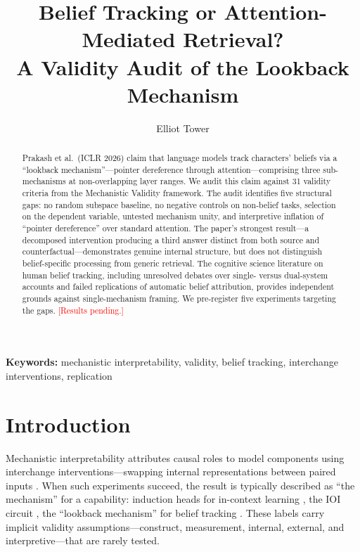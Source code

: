 \documentclass[11pt]{article}
\title{Belief Tracking or Attention-Mediated Retrieval?\\A Validity Audit of the Lookback Mechanism}
\author{Elliot Tower}
\affil{Independent Researcher \\ \texttt{elliot@elliottower.ai}}
\begin{document}
\linenumbers
\maketitle

\begin{abstract}
Prakash et al.\ (ICLR 2026) claim that language models track characters' beliefs via a ``lookback mechanism''---pointer dereference through attention---comprising three sub-mechanisms at non-overlapping layer ranges. We audit this claim against 31 validity criteria from the Mechanistic Validity framework. The audit identifies five structural gaps: no random subspace baseline, no negative controls on non-belief tasks, selection on the dependent variable, untested mechanism unity, and interpretive inflation of ``pointer dereference'' over standard attention. The paper's strongest result---a decomposed intervention producing a third answer distinct from both source and counterfactual---demonstrates genuine internal structure, but does not distinguish belief-specific processing from generic retrieval. The cognitive science literature on human belief tracking, including unresolved debates over single- versus dual-system accounts and failed replications of automatic belief attribution, provides independent grounds against single-mechanism framing. We pre-register five experiments targeting the gaps. \textcolor{red}{[Results pending.]}
\end{abstract}

\noindent\textbf{Keywords:} mechanistic interpretability, validity, belief tracking, interchange interventions, replication


\section{Introduction}
\label{sec:intro}

Mechanistic interpretability attributes causal roles to model components using interchange interventions---swapping internal representations between paired inputs \citep{geiger2021causal, vig2020investigating}. When such experiments succeed, the result is typically described as ``the mechanism'' for a capability: induction heads for in-context learning \citep{olsson2022context}, the IOI circuit \citep{wang2023interpretability}, the ``lookback mechanism'' for belief tracking \citep{prakash2025lookback}. These labels carry implicit validity assumptions---construct, measurement, internal, external, and interpretive---that are rarely tested.
\end{document}
